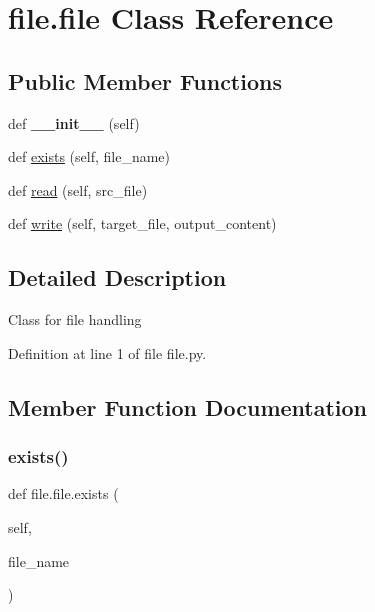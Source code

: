 \hypertarget{classfile_1_1file}{}\section{file.\+file Class Reference}
\label{classfile_1_1file}
\subsection*{Public Member Functions}
\begin{DoxyCompactItemize}
\item 
\mbox{\label{classfile_1_1file_ab090d9bd0278f849d11195aa51738e4e}} 
def {\bfseries \+\_\+\+\_\+init\+\_\+\+\_\+} (self)
\item 
def \mbox{\hyperlink{classfile_1_1file_a6aba188fd5ba1be0a573f19916a13315}{exists}} (self, file\+\_\+name)
\item 
def \mbox{\hyperlink{classfile_1_1file_a410aad2827c9bf0277194525bce39278}{read}} (self, src\+\_\+file)
\item 
def \mbox{\hyperlink{classfile_1_1file_af0444bd1572b6700fe4fd4f9b579a620}{write}} (self, target\+\_\+file, output\+\_\+content)
\end{DoxyCompactItemize}


\subsection{Detailed Description}
\begin{DoxyVerb}Class for file handling\end{DoxyVerb}
 

Definition at line 1 of file file.\+py.



\subsection{Member Function Documentation}
\mbox{\label{classfile_1_1file_a6aba188fd5ba1be0a573f19916a13315}} 
\subsubsection{\texorpdfstring{exists()}{exists()}}
{\footnotesize\ttfamily def file.\+file.\+exists (\begin{DoxyParamCaption}\item[{}]{self,  }\item[{}]{file\+\_\+name }\end{DoxyParamCaption})}

